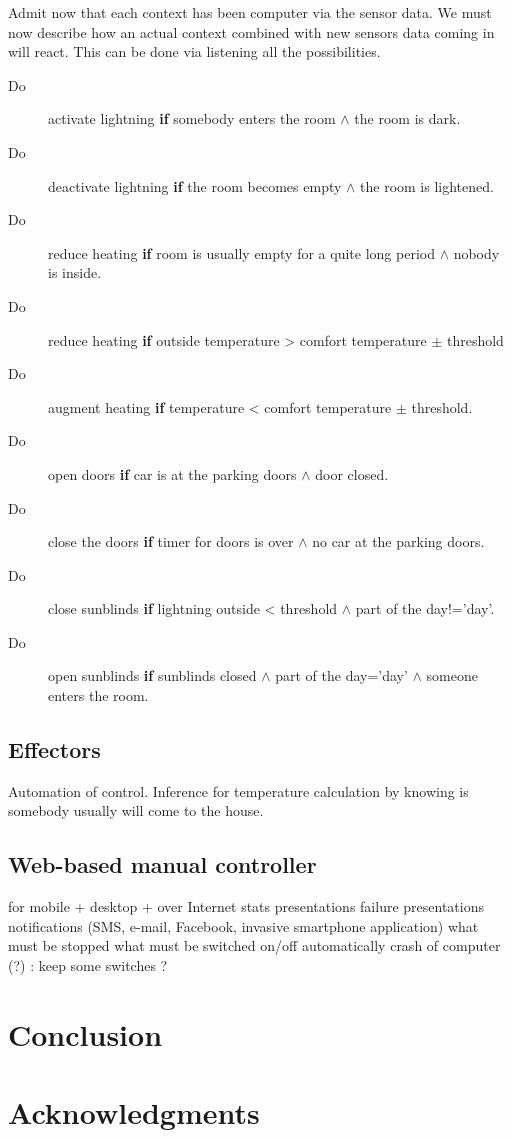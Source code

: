 \documentclass{acm_proc_article-sp}
\begin{document}
Admit now that each context has been computer via the sensor data.
We must now describe how an actual context combined with new sensors data coming in will react. 
This can be done via listening all the possibilities.
\begin{description}
 \item[Do] activate lightning \textbf{if} somebody enters the room $\land$ the room is dark.
 \item[Do] deactivate lightning \textbf{if} the room becomes empty $\land$ the room is lightened.
 \item[Do] reduce heating \textbf{if} room is usually empty for a quite long period $\land$ nobody is inside.
 \item[Do] reduce heating \textbf{if} outside temperature > comfort temperature $\pm$ threshold
 \item[Do] augment heating \textbf{if} temperature < comfort temperature $\pm$ threshold.
 \item[Do] open doors \textbf{if} car is at the parking doors $\land$ door closed.
 \item[Do] close the doors \textbf{if} timer for doors is over $\land$ no car at the parking doors.
 \item[Do] close sunblinds \textbf{if} lightning outside < threshold $\land$ part of the day!=’day’.
 \item[Do] open sunblinds \textbf{if} sunblinds closed $\land$ part of the day=’day’ $\land$ someone enters the room.
\end{description}

\subsection{Effectors}
Automation of control. Inference for temperature calculation by knowing is somebody usually will come to the house.
\subsection{Web-based manual controller}
for mobile + desktop + over Internet
stats presentations
failure presentations
notifications (SMS, e-mail, Facebook, invasive smartphone application)
	what must be stopped
	what must be switched on/off automatically
	crash of computer (?) : keep some switches ?
\section{Conclusion}
\section{Acknowledgments}



%
\end{document}

